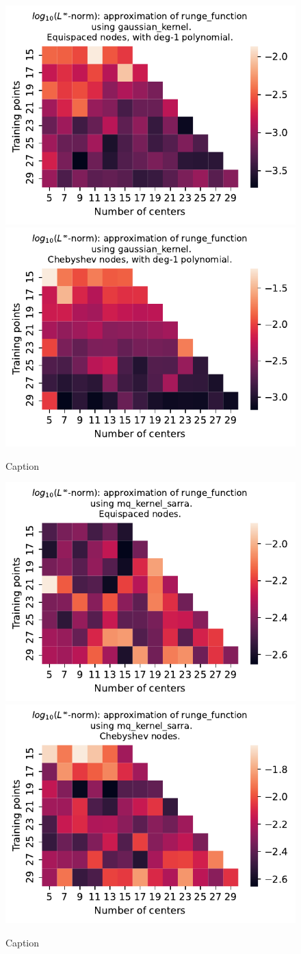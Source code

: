 \documentclass[12pt]{report} %
\begin{document}
\begin{figure}[ht]
    \centering
    
    \includegraphics[width=.49\textwidth]{imagenes/experiments/1d/variational/runge_function-Kgaussian_kernel-Poly-Equi.pdf}
    \includegraphics[width=.49\textwidth]{imagenes/experiments/1d/variational/runge_function-Kgaussian_kernel-Poly-Cheb.pdf}
    \caption{Caption}
    \label{fig:runge-gaussian-poly}
\end{figure}

\begin{figure}[ht]
    \centering
    
    \includegraphics[width=.49\textwidth]{imagenes/experiments/1d/variational/runge_function-Kmq_kernel_sarra-Equi.pdf}
    \includegraphics[width=.49\textwidth]{imagenes/experiments/1d/variational/runge_function-Kmq_kernel_sarra-Cheb.pdf}
    \caption{Caption}
    \label{fig:runge-sarra}
\end{figure}
\end{document}

